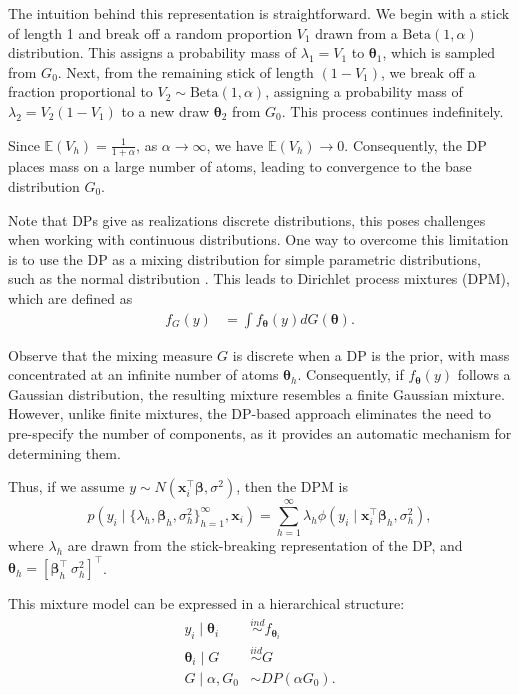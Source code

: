 The intuition behind this representation is straightforward. We begin with a stick of length 1 and break off a random proportion $V_1$ drawn from a $\text{Beta}(1,\alpha)$ distribution. This assigns a probability mass of $\lambda_1=V_1$ to $\boldsymbol{\theta}_1$, which is sampled from $G_0$. Next, from the remaining stick of length $(1-V_1)$, we break off a fraction proportional to $V_2 \sim \text{Beta}(1,\alpha)$, assigning a probability mass of $\lambda_2=V_2(1-V_1)$ to a new draw $\boldsymbol{\theta}_2$ from $G_0$. This process continues indefinitely. 

Since $\mathbb{E}(V_h) = \frac{1}{1+\alpha}$, as $\alpha \rightarrow \infty$, we have $\mathbb{E}(V_h) \rightarrow 0$. Consequently, the DP places mass on a large number of atoms, leading to convergence to the base distribution $G_0$.  

Note that DPs give as realizations discrete distributions, this poses challenges when working with continuous distributions. One way to overcome this limitation is to use the DP as a mixing distribution for simple parametric distributions, such as the normal distribution \cite{Escobar1995}. This leads to Dirichlet process mixtures (DPM), which are defined as  
\begin{align*}
	f_G(y) &= \int f_{\boldsymbol{\theta}}(y) dG(\boldsymbol{\theta}).
\end{align*}

Observe that the mixing measure $G$ is discrete when a DP is the prior, with mass concentrated at an infinite number of atoms $\boldsymbol{\theta}_h$. Consequently, if $f_{\boldsymbol{\theta}}(y)$ follows a Gaussian distribution, the resulting mixture resembles a finite Gaussian mixture. However, unlike finite mixtures, the DP-based approach eliminates the need to pre-specify the number of components, as it provides an automatic mechanism for determining them.

Thus, if we assume $y\sim N(\boldsymbol{x}_i^{\top}\boldsymbol{\beta},\sigma^2)$, then the DPM is 
\[
p(y_i \mid \{\lambda_h, \boldsymbol{\beta}_h, \sigma_h^2\}_{h=1}^{\infty}, \boldsymbol{x}_i) = 
\sum_{h=1}^{\infty} \lambda_h \phi(y_i \mid \boldsymbol{x}_i^{\top}\boldsymbol{\beta}_h, \sigma_h^2),
\]
where $\lambda_h$ are drawn from the stick-breaking representation of the DP, and $\boldsymbol{\theta}_h=[\boldsymbol{\beta}_h^{\top} \ \sigma^2_h]^{\top}$.

This mixture model can be expressed in a hierarchical structure:
\begin{align*}
	y_i\mid \boldsymbol{\theta}_i & \stackrel{ind}{\sim}f_{\boldsymbol{\theta}_i}\\
	\boldsymbol{\theta}_i \mid G & \stackrel{iid}{\sim} G\\
	G \mid \alpha,G_0 & \sim DP(\alpha G_0).
\end{align*}

